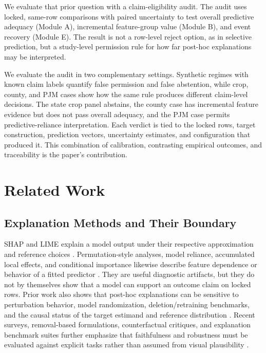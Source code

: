 \documentclass[conference]{IEEEtran}
\begin{document}
We evaluate that prior question with a claim-eligibility audit. The audit uses
locked, same-row comparisons with paired uncertainty to test overall predictive
adequacy (Module A), incremental feature-group value (Module B), and event
recovery (Module E). The result is not a row-level reject option, as in selective
prediction, but a study-level permission rule for how far post-hoc explanations
may be interpreted.

We evaluate the audit in two complementary settings. Synthetic regimes with
known claim labels quantify false permission and false abstention, while crop,
county, and PJM cases show how the same rule produces different claim-level
decisions. The state crop panel abstains, the county case has incremental feature
evidence but does not pass overall adequacy, and the PJM case permits
predictive-reliance interpretation. Each verdict is tied to the locked rows,
target construction, prediction vectors, uncertainty estimates, and configuration
that produced it. This combination of calibration, contrasting empirical
outcomes, and traceability is the paper's contribution.

\section{Related Work}
\subsection{Explanation Methods and Their Boundary}
SHAP and LIME explain a model output under their respective approximation and
reference choices \cite{LundbergLee2017,Ribeiro2016}. Permutation-style analyses,
model reliance, accumulated local effects, and conditional importance likewise
describe feature dependence or behavior of a fitted predictor
\cite{Fisher2019,ApleyZhu2020,Strobl2008}. They are useful diagnostic artifacts,
but they do not by themselves show that a model can support an outcome claim on
locked rows. Prior work also shows that post-hoc explanations can be sensitive to
perturbation behavior, model randomization, deletion/retraining benchmarks, and
the causal status of the target estimand and reference distribution
\cite{Adebayo2018,Hooker2019,Yeh2019,Slack2020,Janzing2020}. Recent surveys,
removal-based formulations, counterfactual critiques, and explanation benchmark
suites further emphasize that faithfulness and robustness must be evaluated
against explicit tasks rather than assumed from visual plausibility
\cite{Covert2021,Keane2021,Agarwal2022,Nauta2023,Hedstrom2023}.
\end{document}
